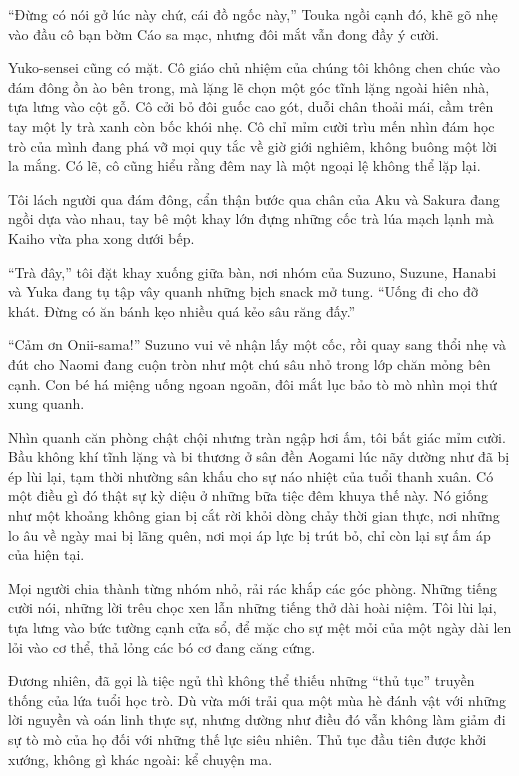 \documentclass[../main.tex]{subfiles}
\begin{document}
``Đừng có nói gở lúc này chứ, cái đồ ngốc này,'' Touka ngồi cạnh đó, khẽ gõ nhẹ vào đầu cô bạn bờm Cáo sa mạc, nhưng đôi mắt vẫn đong đầy ý cười.

Yuko-sensei cũng có mặt. Cô giáo chủ nhiệm của chúng tôi không chen chúc vào đám đông ồn ào bên trong, mà lặng lẽ chọn một góc tĩnh lặng ngoài hiên nhà, tựa lưng vào cột gỗ. Cô cởi bỏ đôi guốc cao gót, duỗi chân thoải mái, cầm trên tay một ly trà xanh còn bốc khói nhẹ. Cô chỉ mỉm cười trìu mến nhìn đám học trò của mình đang phá vỡ mọi quy tắc về giờ giới nghiêm, không buông một lời la mắng. Có lẽ, cô cũng hiểu rằng đêm nay là một ngoại lệ không thể lặp lại.

Tôi lách người qua đám đông, cẩn thận bước qua chân của Aku và Sakura đang ngồi dựa vào nhau, tay bê một khay lớn đựng những cốc trà lúa mạch lạnh mà Kaiho vừa pha xong dưới bếp.

``Trà đây,'' tôi đặt khay xuống giữa bàn, nơi nhóm của Suzuno, Suzune, Hanabi và Yuka đang tụ tập vây quanh những bịch snack mở tung. ``Uống đi cho đỡ khát. Đừng có ăn bánh kẹo nhiều quá kẻo sâu răng đấy.''

``Cảm ơn Onii-sama!'' Suzuno vui vẻ nhận lấy một cốc, rồi quay sang thổi nhẹ và đút cho Naomi đang cuộn tròn như một chú sâu nhỏ trong lớp chăn mỏng bên cạnh. Con bé há miệng uống ngoan ngoãn, đôi mắt lục bảo tò mò nhìn mọi thứ xung quanh.

Nhìn quanh căn phòng chật chội nhưng tràn ngập hơi ấm, tôi bất giác mỉm cười. Bầu không khí tĩnh lặng và bi thương ở sân đền Aogami lúc nãy dường như đã bị ép lùi lại, tạm thời nhường sân khấu cho sự náo nhiệt của tuổi thanh xuân. Có một điều gì đó thật sự kỳ diệu ở những bữa tiệc đêm khuya thế này. Nó giống như một khoảng không gian bị cắt rời khỏi dòng chảy thời gian thực, nơi những lo âu về ngày mai bị lãng quên, nơi mọi áp lực bị trút bỏ, chỉ còn lại sự ấm áp của hiện tại.

Mọi người chia thành từng nhóm nhỏ, rải rác khắp các góc phòng. Những tiếng cười nói, những lời trêu chọc xen lẫn những tiếng thở dài hoài niệm. Tôi lùi lại, tựa lưng vào bức tường cạnh cửa sổ, để mặc cho sự mệt mỏi của một ngày dài len lỏi vào cơ thể, thả lỏng các bó cơ đang căng cứng.

Đương nhiên, đã gọi là tiệc ngủ thì không thể thiếu những ``thủ tục'' truyền thống của lứa tuổi học trò. Dù vừa mới trải qua một mùa hè đánh vật với những lời nguyền và oán linh thực sự, nhưng dường như điều đó vẫn không làm giảm đi sự tò mò của họ đối với những thế lực siêu nhiên. Thủ tục đầu tiên được khởi xướng, không gì khác ngoài: kể chuyện ma.
\end{document}
